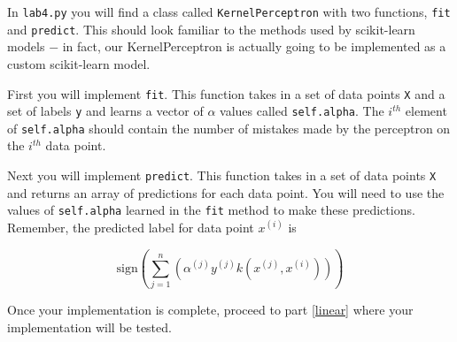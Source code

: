 \documentclass{article}
\begin{document}
In \texttt{lab4.py} you will find a class called \texttt{KernelPerceptron} with two functions, \texttt{fit} and \texttt{predict}. This should look familiar to the methods used by scikit-learn models $-$ in fact, our KernelPerceptron is actually going to be implemented as a custom scikit-learn model.

First you will implement \texttt{fit}. This function takes in a set of data points \texttt{X} and a set of labels \texttt{y} and learns a vector of $\alpha$ values called \texttt{self.alpha}. The $i^{th}$ element of \texttt{self.alpha} should contain the number of mistakes made by the perceptron on the $i^{th}$ data point.

Next you will implement \texttt{predict}. This function takes in a set of data points \texttt{X} and returns an array of predictions for each data point. You will need to use the values of \texttt{self.alpha} learned in the \texttt{fit} method to make these predictions. Remember, the predicted label for data point $x^{(i)}$ is

$$\textrm{sign} \left( \sum_{j=1}^n \left( \alpha^{(j)} y^{(j)} k \left( x^{(j)}, x^{(i)} \right) \right) \right)$$

Once your implementation is complete, proceed to part \ref{linear} where your implementation will be tested.
\end{document}
